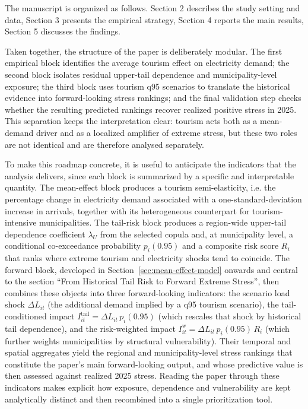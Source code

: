 \documentclass[11pt,a4paper]{article}
\begin{document}
The manuscript is organized as follows. Section 2 describes the study setting
and data, Section 3 presents the empirical strategy, Section 4 reports the main
results, Section 5 discusses the findings.

Taken together, the structure of the paper is deliberately modular. The first empirical block identifies the average tourism effect on electricity demand; the second block isolates residual upper-tail dependence and municipality-level exposure; the third block uses tourism q95 scenarios to translate the historical evidence into forward-looking stress rankings; and the final validation step checks whether the resulting predicted rankings recover realized positive stress in 2025. This separation keeps the interpretation clear: tourism acts both as a mean-demand driver and as a localized amplifier of extreme stress, but these two roles are not identical and are therefore analysed separately.

\noindent
\hangindent=-5mm
To make this roadmap concrete, it is useful to anticipate the indicators that the analysis delivers, since each block is summarized by a specific and interpretable quantity. The mean-effect block produces a tourism semi-elasticity, i.e. the percentage change in electricity demand associated with a one-standard-deviation increase in arrivals, together with its heterogeneous counterpart for tourism-intensive municipalities. The tail-risk block produces a region-wide upper-tail dependence coefficient $\lambda_U$ from the selected copula and, at municipality level, a conditional co-exceedance probability $p_i(0.95)$ and a composite risk score $R_i$ that ranks where extreme tourism and electricity shocks tend to coincide. The forward block, developed in Section~\ref{sec:mean-effect-model} onwards and central to the section ``From Historical Tail Risk to Forward Extreme Stress'', then combines these objects into three forward-looking indicators: the scenario load shock $\Delta L_{it}$ (the additional demand implied by a q95 tourism scenario), the tail-conditioned impact $I_{it}^{\mathrm{tail}} = \Delta L_{it}\,p_i(0.95)$ (which rescales that shock by historical tail dependence), and the risk-weighted impact $I_{it}^{\mathrm{w}} = \Delta L_{it}\,p_i(0.95)\,R_i$ (which further weights municipalities by structural vulnerability). Their temporal and spatial aggregates yield the regional and municipality-level stress rankings that constitute the paper's main forward-looking output, and whose predictive value is then assessed against realized 2025 stress. Reading the paper through these indicators makes explicit how exposure, dependence and vulnerability are kept analytically distinct and then recombined into a single prioritization tool.
\end{document}
